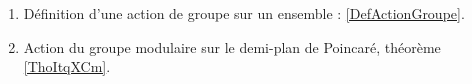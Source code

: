     \label{THEMEooKZHBooRCULcr}
    \begin{enumerate}
        \item Définition d'une action de groupe sur un ensemble : \ref{DefActionGroupe}.
    \item Action du groupe modulaire sur le demi-plan de Poincaré, théorème \ref{ThoItqXCm}. 
    \end{enumerate}

